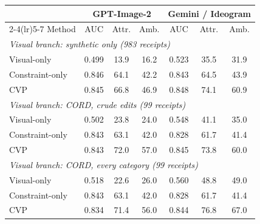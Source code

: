 \begin{tabular}{lcccccc}
\toprule
 & \multicolumn{3}{c}{GPT-Image-2} & \multicolumn{3}{c}{Gemini / Ideogram}\\
\cmidrule(lr){2-4}\cmidrule(lr){5-7}
Method & AUC & Attr. & Amb. & AUC & Attr. & Amb.\\
\midrule
\multicolumn{7}{l}{\emph{Visual branch: synthetic only (983 receipts)}}\\
Visual-only & 0.499 & 13.9 & 16.2 & 0.523 & 35.5 & 31.9\\
Constraint-only & 0.846 & 64.1 & 42.2 & 0.843 & 64.5 & 43.9\\
CVP & 0.845 & 66.8 & 46.9 & 0.848 & 74.1 & 60.9\\
\midrule
\multicolumn{7}{l}{\emph{Visual branch: CORD, crude edits (99 receipts)}}\\
Visual-only & 0.502 & 23.8 & 24.0 & 0.548 & 41.1 & 35.0\\
Constraint-only & 0.843 & 63.1 & 42.0 & 0.828 & 61.7 & 41.4\\
CVP & 0.843 & 72.0 & 57.0 & 0.845 & 73.8 & 60.0\\
\midrule
\multicolumn{7}{l}{\emph{Visual branch: CORD, every category (99 receipts)}}\\
Visual-only & 0.518 & 22.6 & 26.0 & 0.560 & 48.8 & 49.0\\
Constraint-only & 0.843 & 63.1 & 42.0 & 0.828 & 61.7 & 41.4\\
CVP & 0.834 & 71.4 & 56.0 & 0.844 & 76.8 & 67.0\\
\bottomrule
\end{tabular}
